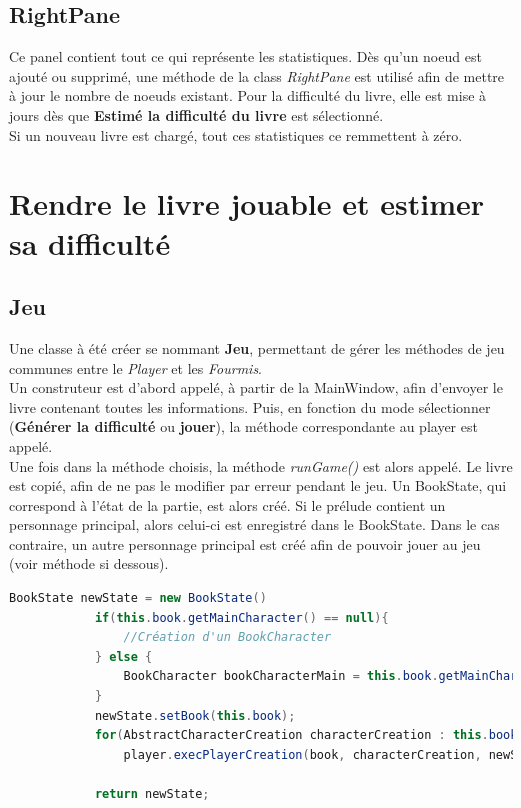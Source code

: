 		\subsection{RightPane}

		Ce panel contient tout ce qui représente les statistiques. Dès qu'un noeud est ajouté ou supprimé, une méthode de la class \textit{RightPane} est utilisé afin de mettre à jour le nombre de noeuds existant. Pour la difficulté du livre, elle est mise à jours dès que \textbf{Estimé la difficulté du livre} est sélectionné.\\
		Si un nouveau livre est chargé, tout ces statistiques ce remmettent à zéro.



	\section{Rendre le livre jouable et estimer sa difficulté}\label{sec:Jeu}
		\subsection{Jeu}
		Une classe à été créer se nommant \textbf{Jeu}, permettant de gérer les méthodes de jeu communes entre le \textit{Player} et les \textit{Fourmis}.\\
		Un construteur est d'abord appelé, à partir de la MainWindow, afin d'envoyer le livre contenant toutes les informations. Puis, en fonction du mode sélectionner (\textbf{Générer la difficulté} ou \textbf{jouer}), la méthode correspondante au player est appelé.\\
		Une fois dans la méthode choisis, la méthode \textit{runGame()} est alors appelé. Le livre est copié, afin de ne pas le modifier par erreur pendant le jeu. Un BookState, qui correspond à l'état de la partie, est alors créé. Si le prélude contient un personnage principal, alors celui-ci est enregistré dans le BookState. Dans le cas contraire, un autre personnage principal est créé afin de pouvoir jouer au jeu (voir méthode si dessous).

		\begin{lstlisting}[language=java, caption=createNewState()]
			BookState newState = new BookState()
			if(this.book.getMainCharacter() == null){
				//Création d'un BookCharacter
			} else {
				BookCharacter bookCharacterMain = this.book.getMainCharacter();
			}
			newState.setBook(this.book);
			for(AbstractCharacterCreation characterCreation : this.book.getCharacterCreations())
				player.execPlayerCreation(book, characterCreation, newState);

			return newState;
		\end{lstlisting}

